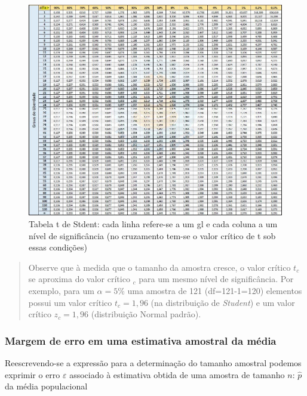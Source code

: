 \documentclass[
]{book}
\begin{document}
\hfill\break

\begin{figure}

{\centering \includegraphics[width=1\linewidth]{images7/tabela_t} 

}

\caption{Tabela t de Stdent: cada linha refere-se a um gl e cada coluna a um nível de significância (no cruzamento tem-se o valor crítico de t sob essas condições)}\label{fig:fig42}
\end{figure}

\begin{quote}
Observe que à medida que o tamanho da amostra cresce, o valor crítico \(t_{c}\) se aproxima do valor crítico \(_{c}\) para um mesmo nível de significância. Por exemplo, para um \(\alpha=5\%\) uma amostra de 121 (df=121-1=120) elementos possui um valor crítico \(t_{c}=1,96\) (na distribuição de \emph{Student}) e um valor crítico \(z_{c}=1,96\) (distribuição Normal padrão).
\end{quote}

\hypertarget{margem-de-erro-em-uma-estimativa-amostral-da-muxe9dia}{%
\subsubsection{Margem de erro em uma estimativa amostral da média}\label{margem-de-erro-em-uma-estimativa-amostral-da-muxe9dia}}

\hfill\break

Reescrevendo-se a expressão para a determinação do tamanho amostral podemos exprimir o erro \(\varepsilon\) associado à estimativa obtida de uma amostra de tamanho \(n\): \(\hat{p}\) da média populacional
\end{document}
